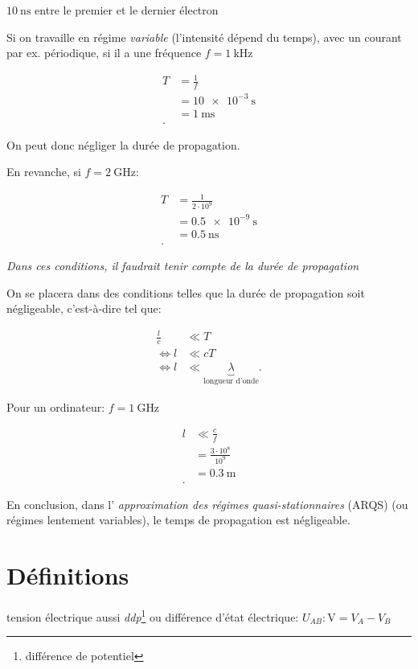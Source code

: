 \documentclass{article}
\newenvironment{definition}{\begin{description}[leftmargin=!,labelwidth=\widthof{\bfseries Lorem ipsum dolor}]}{\end{description}}
\begin{document}
$\SI{10}{\nano\second}$ entre le premier et le dernier électron

Si on travaille en régime \emph{variable} (l'intensité dépend du temps), avec un courant par ex. périodique, si il a une fréquence $f=\SI{1}{\kilo\hertz}$

\begin{align*}
	T&= \frac{1}{f} \\
	&= \SI{10e-3}{\second} \\
	&= \SI{1}{\milli\second} \\
.\end{align*}

On peut donc négliger la durée de propagation.

En revanche, si $f = \SI{2}{\giga\hertz}$:

\begin{align*}
	T &= \frac{1}{2\cdot 10^9} \\
	&= \SI{0.5e-9}{\second} \\
	&= \SI{0.5}{\nano\second} \\
.\end{align*}

\emph{Dans ces conditions, il faudrait tenir compte de la durée de propagation}

On se placera dans des conditions telles que la durée de propagation soit négligeable, c'est-à-dire tel que:

\begin{align*}
	\frac{l}{c} &\ll T \\
	\iff l &\ll cT \\
	\iff l &\ll \underbrace{\lambda}_{\text{longueur d'onde}}
.\end{align*}

Pour un ordinateur: $f = \SI{1}{\giga\hertz}$

\begin{align*}
	l &\ll \frac{c}{f} \\
	&= \frac{3\cdot 10^8}{10^9} \\
	&= \SI{0.3}{\meter} \\
.\end{align*}

En conclusion, dans l' \emph{approximation des régimes quasi-stationnaires} (ARQS)  (ou régimes lentement variables), le temps de propagation est négligeable.

\section{Définitions}
\begin{definition}
\item[tension électrique] aussi \emph{ddp}\footnote{différence de potentiel} ou différence d'état électrique: $U_{AB}: \text{V} = V_A - V_B$
\end{definition}
\end{document}
